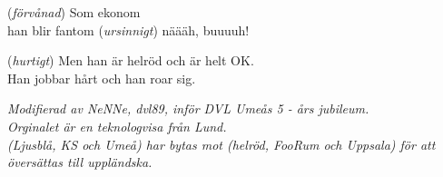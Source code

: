 \vspace{10pt}
(\textit{förvånad}) Som ekonom\\
han blir fantom (\textit{ursinnigt}) näääh, buuuuh!\par
\vspace{10pt}
(\textit{hurtigt}) \revrpt Men han är helröd och är helt OK.\\
Han jobbar hårt och han roar sig.\rpt\par
\vspace{10pt}
{\footnotesize\textit{Modifierad av NeNNe, dvl89, inför
    DVL Umeås 5 - års jubileum.\\ Orginalet är en
    teknologvisa från Lund.\\ (Ljusblå, KS och Umeå) har bytas mot
    (helröd, FooRum och Uppsala) för att översättas till uppländska.}}

